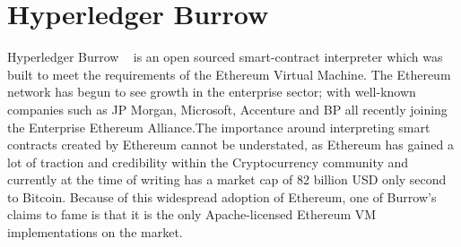 \section{Hyperledger Burrow}

Hyperledger Burrow ~\cite{hid-sp18-414-Behlendorf} is an open sourced smart-contract interpreter which
was built to meet the requirements of the Ethereum Virtual
Machine. The Ethereum network has begun to see growth in the
enterprise sector; with well-known companies such as JP Morgan,
Microsoft, Accenture and BP all recently joining the Enterprise
Ethereum Alliance.The importance around interpreting
smart contracts created by Ethereum cannot be understated, as Ethereum
has gained a lot of traction and credibility within the Cryptocurrency
community and currently at the time of writing has a market cap of 82
billion USD only second to Bitcoin. Because of this widespread
adoption of Ethereum, one of Burrow’s claims to fame is that it is the
only Apache-licensed Ethereum VM implementations on the
market.~\cite{hid-sp18-414-Hyperledger_Burrow}


